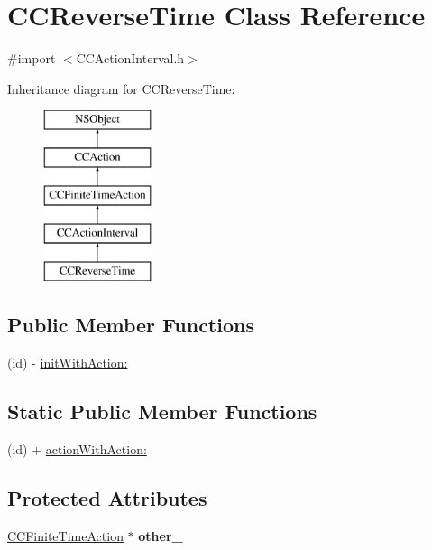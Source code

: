 \hypertarget{interface_c_c_reverse_time}{\section{C\-C\-Reverse\-Time Class Reference}
\label{interface_c_c_reverse_time}
}


{\ttfamily \#import $<$C\-C\-Action\-Interval.\-h$>$}

Inheritance diagram for C\-C\-Reverse\-Time\-:\begin{figure}[H]
\begin{center}
\leavevmode
\includegraphics[height=5.000000cm]{interface_c_c_reverse_time}
\end{center}
\end{figure}
\subsection*{Public Member Functions}
\begin{DoxyCompactItemize}
\item 
(id) -\/ \hyperlink{interface_c_c_reverse_time_a9608cb958a6bcfdef40e0c786b67f929}{init\-With\-Action\-:}
\end{DoxyCompactItemize}
\subsection*{Static Public Member Functions}
\begin{DoxyCompactItemize}
\item 
(id) + \hyperlink{interface_c_c_reverse_time_a4752c7d6c6f3395677e3147846c27e5e}{action\-With\-Action\-:}
\end{DoxyCompactItemize}
\subsection*{Protected Attributes}
\begin{DoxyCompactItemize}
\item 
\hypertarget{interface_c_c_reverse_time_a13b6d47094f4e60d08c02641553d76ad}{\hyperlink{interface_c_c_finite_time_action}{C\-C\-Finite\-Time\-Action} $\ast$ {\bfseries other\-\_\-}}\label{interface_c_c_reverse_time_a13b6d47094f4e60d08c02641553d76ad}

\end{DoxyCompactItemize}


